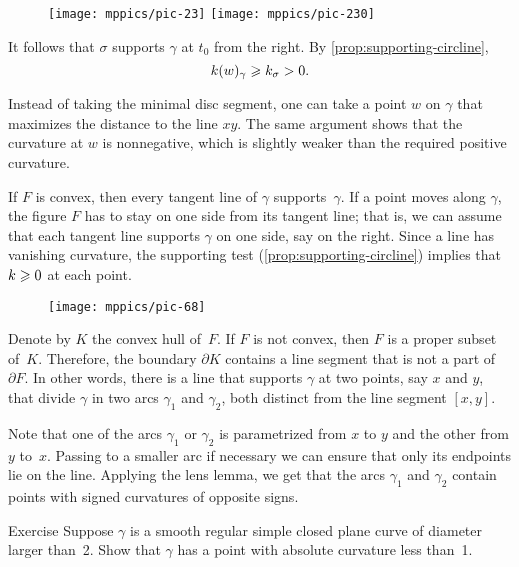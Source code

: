 {

\begin{wrapfigure}{o}{50 mm}
\vskip-2mm
\centering
\texttt{[image: mppics/pic-23]}
\bigskip
\texttt{[image: mppics/pic-230]}
\end{wrapfigure}

It follows that $\sigma$ supports $\gamma$ at $t_0$ from the right.
By \ref{prop:supporting-circline}, 
\[k(w)_\gamma\geqslant k_\sigma >0.\]
\qedsf

Instead of taking the minimal disc segment, one can take a point $w$ on $\gamma$ that maximizes the distance to the line $xy$.
The same argument shows that the curvature at $w$ is nonnegative, which is slightly weaker than the required positive curvature.

}

If $F$ is convex, then every tangent line of $\gamma$ supports~$\gamma$.
If a point moves along $\gamma$, the figure $F$ has to stay on one side from its tangent line;
that is, we can assume that each tangent line supports $\gamma$ on one side, say on the right.
Since a line has vanishing curvature, the supporting test (\ref{prop:supporting-circline}) implies that $k\geqslant 0$ at each point.

\begin{wrapfigure}{r}{35 mm}
\vskip-3mm
\centering
\texttt{[image: mppics/pic-68]}
\vskip0mm
\end{wrapfigure}

Denote by $K$ the convex hull of~$F$.
If $F$ is not convex, then $F$ is a proper subset of~$K$.
Therefore, the boundary $\partial K$ contains a line segment that is not a part of $\partial F$.
In other words, there is a line that supports $\gamma$ at two points, say $x$ and $y$, that divide $\gamma$ in two arcs $\gamma_1$ and $\gamma_2$, both distinct from the line segment $[x,y]$.

Note that one of the arcs $\gamma_1$ or $\gamma_2$ is parametrized from $x$ to $y$ and the other from $y$ to~$x$.
Passing to a smaller arc if necessary we can ensure that only its endpoints lie on the line. 
Applying the lens lemma, we get that the arcs $\gamma_1$ and $\gamma_2$ contain points with signed curvatures of opposite signs.
\qeds

\begin{thm}{Exercise}\label{ex:convex small}
Suppose $\gamma$ is a smooth regular simple closed plane curve of diameter larger than~2.
Show that $\gamma$ has a point with absolute curvature less than~1.
\end{thm}

